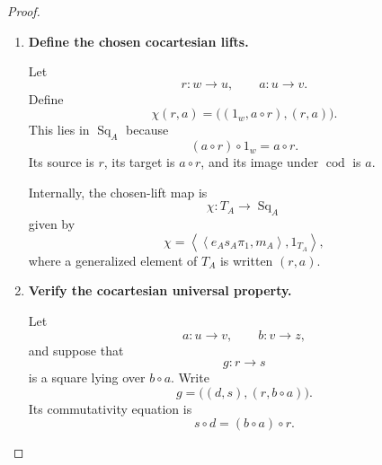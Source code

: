\begin{proof}
\begin{enumerate}
        For a commutative square
        \[
            \bigl((c,r'),(r,a)\bigr),
        \]
        the pair \((r,a)\in T_A\) gives
        \[
            t_A(r)=s_A(a).
        \]
        Moreover,
        \[
            t_A(r')
            =
            t_A(r'\circ c)
            =
            t_A(a\circ r)
            =
            t_A(a).
        \]
        Hence
        \[
            s_A\operatorname{cod}_1
            =
            \operatorname{cod}_0s_{\operatorname{Res}},
        \]
        and
        \[
            t_A\operatorname{cod}_1
            =
            \operatorname{cod}_0t_{\operatorname{Res}}.
        \]

        The bottom edge of the identity square at \(r\) is
        \(1_{t_A(r)}\), and the bottom edge of the composite of squares over
        \(a\) and \(b\) is \(b\circ a\). Therefore
        \[
            \operatorname{cod}
        \]
        preserves identities and composition.

        \item \textbf{Define the chosen cocartesian lifts.}

        Let
        \[
            r:w\to u,
            \qquad
            a:u\to v.
        \]
        Define
        \[
            \chi(r,a)
            =
            \bigl(
                (1_w,a\circ r),
                (r,a)
            \bigr).
        \]
        This lies in \(\operatorname{Sq}_A\) because
        \[
            (a\circ r)\circ1_w
            =
            a\circ r.
        \]
        Its source is \(r\), its target is \(a\circ r\), and its image under
        \(\operatorname{cod}\) is \(a\).

        Internally, the chosen-lift map is
        \[
            \chi:
            T_A\to\operatorname{Sq}_A
        \]
        given by
        \[
            \chi
            =
            \left\langle
                \left\langle
                    e_As_A\pi_1,
                    m_A
                \right\rangle,
                1_{T_A}
            \right\rangle,
        \]
        where a generalized element of \(T_A\) is written \((r,a)\).

        \item \textbf{Verify the cocartesian universal property.}

        Let
        \[
            a:u\to v,
            \qquad
            b:v\to z,
        \]
        and suppose that
        \[
            g:r\to s
        \]
        is a square lying over \(b\circ a\). Write
        \[
            g
            =
            \bigl(
                (d,s),
                (r,b\circ a)
            \bigr).
        \]
        Its commutativity equation is
        \[
            s\circ d=(b\circ a)\circ r.
        \]


\end{enumerate}
\end{proof}
